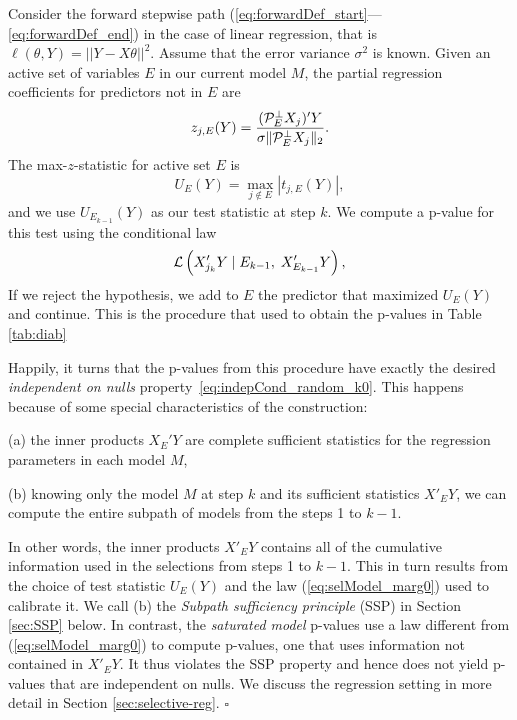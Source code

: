 \documentclass{article}
\begin{document}
\medskip
\begin{example}
Consider the forward stepwise path (\ref{eq:forwardDef_start}---\ref{eq:forwardDef_end}) in the case of linear regression, that is 
$\ell(\theta,Y)=||Y-X\theta||^2$.  Assume that the error variance $\sigma^2$ is known.
 Given an active set of variables $E$ in our current model $M$, the partial regression coefficients for predictors not in $E$ are
\begin{equation}
  z_{j,E}(Y) = \frac{(\mathcal{P}_E^\perp X_j)'Y}
  {\sigma\|\mathcal{P}_{E}^\perp X_j\|_2}.
\end{equation}
The max-$z$-statistic for active set $E$  is
\begin{equation}\label{eq:maxT}
  U_E(Y) = \max_{j \notin E} \left|t_{j,E}(Y)\right|,
\end{equation}
and we use $U_{E_{k-1}}(Y)$ as our test statistic at step $k$. We compute a p-value for this test
using the conditional law 
\begin{equation}\label{eq:selModel_marg0}
\mathcal{L}\left(X_{j_k}'Y \mid E_{k-1}, \; X_{E_{k-1}}'Y\right),
\end{equation}
If we reject the hypothesis, we add to $E$ the predictor that maximized $U_E(Y)$ and continue.
This is the procedure that used to obtain the p-values in Table \ref{tab:diab}  

Happily,  it turns that the  p-values from this procedure have exactly the desired {\it independent on nulls} property~\eqref{eq:indepCond_random_k0}.
This happens because of some special characteristics of the construction: 
\begin{description}
\item{(a)}  the inner products $X_E'Y$ are complete sufficient statistics for the regression
parameters in each model $M$,
\item{(b)} knowing only the  model $M$ at step $k$ and its sufficient statistics $X'_EY$, we can compute the entire subpath
of models from the steps 1 to $k-1$. 
\end{description}
 In other words, the inner products $X'_EY$ contains  all of the cumulative information used in the selections from
steps 1 to $k-1$. This in turn results from    the choice  of test statistic $U_E(Y)$  and the law (\ref{eq:selModel_marg0}) used to calibrate it.
We call (b)  the {\it Subpath sufficiency principle} (SSP) in Section \ref{sec:SSP}  below.
In contrast, the {\it saturated model} p-values use a law different from (\ref{eq:selModel_marg0}) to compute p-values, one that uses
information not contained in $X'_EY$. It thus violates the SSP property and hence does not yield p-values that are independent on nulls.
We discuss the regression setting in more detail in Section \ref{sec:selective-reg}.  $\square$
\end{example}
\end{document}
